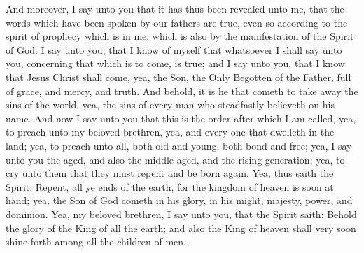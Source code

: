 And moreover, I say unto you that it has thus been revealed unto me, that the words which have been spoken by our fathers are true, even so according to the spirit of prophecy which is in me, which is also by the manifestation of the Spirit of God.
\bverse \iffalse I say unto you, that I know of myself that whatsoever I shall say unto you, concerning that which is to come, is true; and I say unto you, that I know that Jesus Christ shall come, yea, the Son, the Only Begotten of the Father, full of grace, and mercy, and truth. And behold, it is he that cometh to take away the sins of the world, yea, the sins of every man who steadfastly believeth on his name. \fi
I say unto you, that I know of myself that whatsoever I shall say unto you, concerning that which is to come, is true; and I say unto you, that I know that Jesus Christ shall come, yea, the Son, the Only Begotten of the Father, full of grace, and mercy, and truth. And behold, it is he that cometh to take away the sins of the world, yea, the sins of every man who steadfastly believeth on his name.
\bverse \iffalse And now I say unto you that this is the order after which I am called, yea, to preach unto my beloved brethren, yea, and every one that dwelleth in the land; yea, to preach unto all, both old and young, both bond and free; yea, I say unto you the aged, and also the middle aged, and the rising generation; yea, to cry unto them that they must repent and be born again. \fi
And now I say unto you that this is the order after which I am called, yea, to preach unto my beloved brethren, yea, and every one that dwelleth in the land; yea, to preach unto all, both old and young, both bond and free; yea, I say unto you the aged, and also the middle aged, and the rising generation; yea, to cry unto them that they must repent and be born again.
\bverse \iffalse Yea, thus saith the Spirit: Repent, all ye ends of the earth, for the kingdom of heaven is soon at hand; yea, the Son of God cometh in his glory, in his might, majesty, power, and dominion.  Yea, my beloved brethren, I say unto you, that the Spirit saith: Behold the glory of the King of all the earth; and also the King of heaven shall very soon shine forth among all the children of men. \fi
Yea, thus saith the Spirit: Repent, all ye ends of the earth, for the kingdom of heaven is soon at hand; yea, the Son of God cometh in his glory, in his might, majesty, power, and dominion.  Yea, my beloved brethren, I say unto you, that the Spirit saith: Behold the glory of the King of all the earth; and also the King of heaven shall very soon shine forth among all the children of men.
